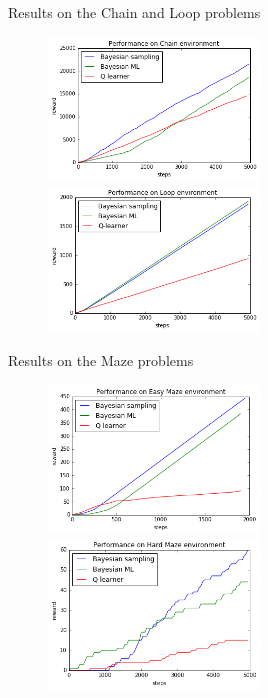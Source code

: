 \documentclass{beamer}
\begin{document}
\begin{frame}{Results on the Chain and Loop problems}
\begin{figure}
\centering
\includegraphics[width=0.5\textwidth]{chainPerf.png}
\includegraphics[width=0.5\textwidth]{loopPerf.png}
\end{figure}
\end{frame}

\begin{frame}{Results on the Maze problems}
\begin{figure}[!htb]
\centering
\includegraphics[width=0.5\textwidth]{smallMazePerf.png}
\includegraphics[width=0.5\textwidth]{largeMazePerf.png}
\end{figure}
\end{frame}
\end{document}
